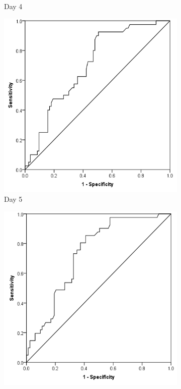 \begin{figure}[t]
\begin{subfigure}{0.3\textwidth}
		\caption{Day 4}
		\label{fig:crp_comp_ROC_infection_D4}
	\end{subfigure}
	\hfill
	\begin{subfigure}{0.3\textwidth}
		\centering
		\includegraphics[width=\textwidth]{Figures/crp_comp_ROC_infection_D5}
		\caption{Day 5}
		\label{fig:crp_comp_ROC_infection_D5}
	\end{subfigure}
	\begin{subfigure}{0.3\textwidth}
		\centering
		\includegraphics[width=\textwidth]{Figures/crp_comp_ROC_infection_D6}

\end{subfigure}
\end{figure}
